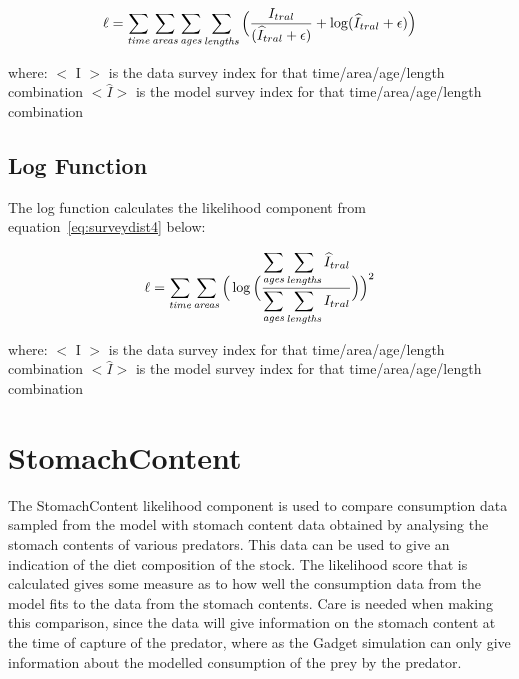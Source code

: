 \documentclass[10pt,twoside]{book}
\begin{document}
\begin{equation}\label{eq:surveydist3}
\ell = \sum_{\it time}\sum_{\it areas}\sum_{\it ages}\sum_{\it lengths} \Big( {\frac{ I_{tral}} { (\widehat{I}_{tral} + \epsilon )} + \log ({\widehat{I}_{tral} + \epsilon}}) \Big)
\end{equation}

where:\newline
$<$ I $>$ is the data survey index for that time/area/age/length combination\newline
$<\widehat{I}>$ is the model survey index for that time/area/age/length combination

\subsection{Log Function}
The log function calculates the likelihood component from equation~\ref{eq:surveydist4} below:

\begin{equation}\label{eq:surveydist4}
\ell = \sum_{\it time}\sum_{\it areas} \Big(  \log \Big( {\frac{ \displaystyle \sum_{\it ages}\sum_{\it lengths}  \widehat{I}_{tral}} { \displaystyle \sum_{\it ages}\sum_{\it lengths} I_{tral}}} \Big) \Big) ^2
\end{equation}

where:\newline
$<$ I $>$ is the data survey index for that time/area/age/length combination\newline
$<\widehat{I}>$ is the model survey index for that time/area/age/length combination

\section{StomachContent}\label{sec:stomach}
The StomachContent likelihood component is used to compare consumption data sampled from the model with stomach content data obtained by analysing the stomach contents of various predators.  This data can be used to give an indication of the diet composition of the stock.  The likelihood score that is calculated gives some measure as to how well the consumption data from the model fits to the data from the stomach contents.  Care is needed when making this comparison, since the data will give information on the stomach content at the time of capture of the predator, where as the Gadget simulation can only give information about the modelled consumption of the prey by the predator.
\end{document}
